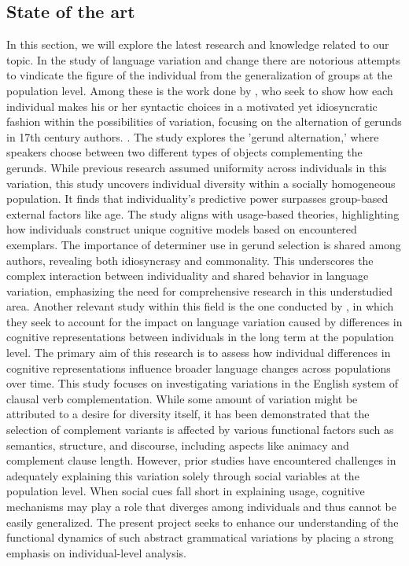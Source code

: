 \documentclass[final]{clv3} %
\begin{document}
\subsection{State of the art}
In this section, we will explore the latest research and knowledge related to our topic. 
In the study of language variation and change there are notorious attempts to vindicate the figure of the individual from the generalization of groups at the population level. Among these is the work done by \citet{fonteyn2020individuality}, who seek to show how each individual makes his or her syntactic choices in a motivated yet idiosyncratic fashion within the possibilities of variation, focusing on the alternation of gerunds in 17th century authors. \citep{fonteyn2020individuality}. The study explores the ’gerund alternation,’ where speakers choose between two different types of objects complementing the gerunds. While previous research assumed uniformity across individuals in this variation, this study uncovers individual diversity within a socially homogeneous population. It finds that individuality’s predictive power surpasses group-based external factors like age. The study aligns with usage-based theories, highlighting how individuals construct unique cognitive models based on encountered exemplars. The importance of determiner use in gerund selection is shared among authors, revealing both idiosyncrasy and commonality. This underscores the complex interaction between individuality and shared behavior in language variation, emphasizing the need for comprehensive research in this understudied area.
Another relevant study within this field is the one conducted by \citet{cuyckens2021complexity}, in which they seek to account for the impact on language variation caused by differences in cognitive representations between individuals in the long term at the population level. The primary aim of this research is to assess how individual differences in cognitive representations influence broader language changes across populations over time. This study focuses on investigating variations in the English system of clausal verb complementation. While some amount of variation might be attributed to a desire for diversity itself, it has been demonstrated that the selection of complement variants is affected by various functional factors such as semantics, structure, and discourse, including aspects like animacy and complement clause length. However, prior studies have encountered challenges in adequately explaining this variation solely through social variables at the population level. When social cues fall short in explaining usage, cognitive mechanisms may play a role that diverges among individuals and thus cannot be easily generalized. The present project seeks to enhance our understanding of the functional dynamics of such abstract grammatical variations by placing a strong emphasis on individual-level analysis.
\end{document}
